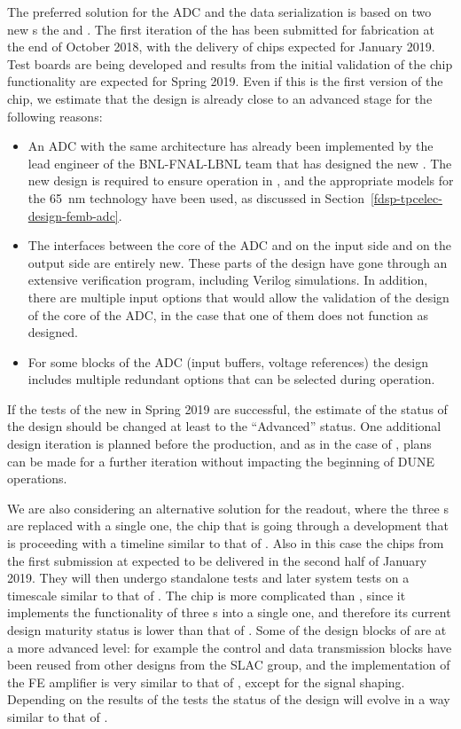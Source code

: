 The preferred solution for the ADC and the data serialization is based on two new 
s the  and .
The first iteration of the  has been submitted for fabrication
at the end of October 2018, with the delivery of chips expected for January 2019.
Test boards are being developed and results from the initial validation of the
chip functionality are expected for Spring 2019. Even if this is the first version
of the chip, we estimate that the design is already close to an advanced stage
for the following reasons:
\begin{itemize}
\item{An ADC with the same architecture has already been implemented by the
lead engineer of the BNL-FNAL-LBNL team that has designed the new .
The new design is required to ensure operation in \lar, and the appropriate
models for the \SI{65}{nm} technology have been used, as discussed in
Section~\ref{fdsp-tpcelec-design-femb-adc}.}
\item{The interfaces between the core of the ADC and  on 
the input side and  on the output side are entirely new.
These parts of the design have gone through an extensive verification
program, including Verilog simulations. In addition, there are multiple 
input options that would allow the validation of the design of the core 
of the ADC, in the case that one of them does not function as designed.}
\item{For some blocks of the ADC (input buffers, voltage references) the
design includes multiple redundant options that can be selected during 
operation.}
\end{itemize}
If the tests of the new  in Spring 2019 are successful, the
estimate of the status of the design should be changed at least to the 
``Advanced'' status. One additional design iteration is planned before
the production, and as in the case of , plans can be made for a
further iteration without impacting the beginning of DUNE operations.

We are also considering an alternative solution for the readout, where
the three s are replaced with a single one, the 
chip that is going through a development that is proceeding with a 
timeline similar to that of . Also in this case the
chips from the first submission at expected to be delivered in the
second half of January 2019. They will then undergo standalone tests
and later system tests on a timescale similar to that of .
The  chip is more complicated than ,
since it implements the functionality of three s into a
single one, and therefore its current design maturity status is
lower than that of . Some of the design blocks of
 are at a more advanced level: for example the control
and data transmission blocks have been reused from other 
designs from the SLAC group, and the implementation of the FE amplifier
is very similar to that of , except for the signal 
shaping. Depending on the results of the tests the status of the
 design will evolve in a way similar to that of .

